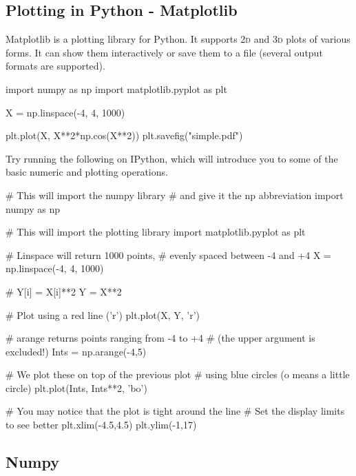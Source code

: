 \subsection{Plotting in Python - Matplotlib}

Matplotlib is a plotting library for Python. It supports \textsc{2d} and
\textsc{3d} plots of various forms. It can show them interactively or save them
to a file (several output formats are supported).

\begin{python}
import numpy as np
import matplotlib.pyplot as plt

X = np.linspace(-4, 4, 1000)

plt.plot(X, X**2*np.cos(X**2))
plt.savefig("simple.pdf")
\end{python}


\begin{exercise}
Try running the following on IPython, which will introduce you to some of the basic numeric and plotting operations.

\begin{python}
# This will import the numpy library
# and give it the np abbreviation
import numpy as np

# This will import the plotting library
import matplotlib.pyplot as plt

# Linspace will return 1000 points,
# evenly spaced between -4 and +4
X = np.linspace(-4, 4, 1000)

# Y[i] = X[i]**2
Y = X**2

# Plot using a red line ('r')
plt.plot(X, Y, 'r')

# arange returns points ranging from -4 to +4
# (the upper argument is excluded!)
Ints = np.arange(-4,5)

# We plot these on top of the previous plot
# using blue circles (o means a little circle)
plt.plot(Ints, Ints**2, 'bo')

# You may notice that the plot is tight around the line
# Set the display limits to see better
plt.xlim(-4.5,4.5)
plt.ylim(-1,17)
\end{python}
\end{exercise}


\subsection{Numpy}

